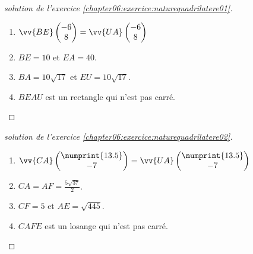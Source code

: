 \documentclass[main.tex]{subfiles}
\begin{document}
\begin{proof}[solution de l'exercice  \ref{chapter06:exercice:naturequadrilatere01}]   \hfill
	
	\begin{enumerate}[label=\alph*)]
		\item $\vv{BE}\begin{pmatrix}
			-6\\ 8 
		\end{pmatrix} =\vv{UA}\begin{pmatrix}
			-6\\ 8
		\end{pmatrix}$
		\item  $BE=10$  et $EA =40$.
		\item $BA=10\sqrt{17}$ et $EU=10\sqrt{17}$.
		\item $BEAU$ est un rectangle qui n'est pas carré.
	\end{enumerate} 
\end{proof}
\begin{proof}[solution de l'exercice  \ref{chapter06:exercice:naturequadrilatere02}]  \hfill  
	
	\begin{enumerate}[label=\alph*)]
		\item $\vv{CA}\begin{pmatrix}
			\numprint{13.5}\\ -7 
		\end{pmatrix} =\vv{UA}\begin{pmatrix}
			\numprint{13.5}\\ -7 
		\end{pmatrix}$
		\item $CA=AF=\tfrac{5\sqrt{37}}{2}$.
		\item $CF=5$ et $AE=\sqrt{445}$.
		\item $CAFE$ est un losange qui n'est pas carré.
	\end{enumerate} 
\end{proof}

 

%	 
\end{document}
